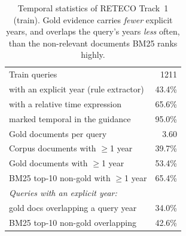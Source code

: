 \begin{table}[t]
\centering
\small
\begin{tabular}{lr}
\toprule
Train queries & 1211 \\
\quad with an explicit year (rule extractor) & 43.4\% \\
\quad with a relative time expression & 65.6\% \\
\quad marked temporal in the guidance & 95.0\% \\
Gold documents per query & 3.60 \\
\midrule
Corpus documents with $\geq$1 year & 39.7\% \\
Gold documents with $\geq$1 year & 53.4\% \\
BM25 top-10 non-gold with $\geq$1 year & 65.4\% \\
\midrule
\multicolumn{2}{l}{\textit{Queries with an explicit year:}} \\
\quad gold docs overlapping a query year & 34.0\% \\
\quad BM25 top-10 non-gold overlapping & 42.6\% \\
\bottomrule
\end{tabular}
\caption{Temporal statistics of RETECO Track~1 (train). Gold evidence carries \emph{fewer} explicit years, and overlaps the query's years \emph{less} often, than the non-relevant documents BM25 ranks highly.}
\label{tab:data}
\end{table}